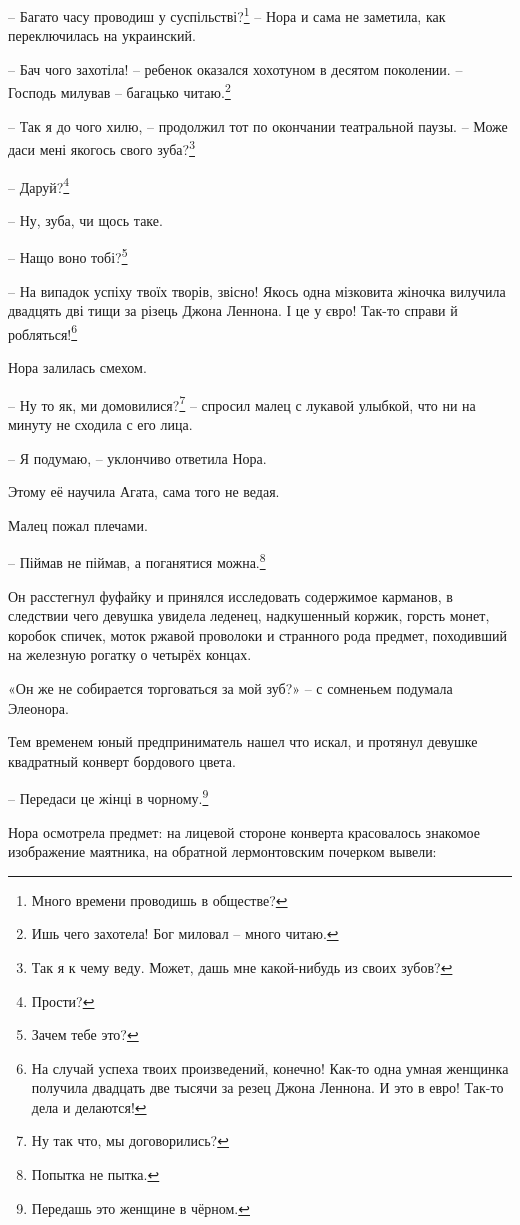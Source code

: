 \documentclass[
  a5paperpaper,
  DIV=11,
  numbers=noendperiod]{scrreprt}
\begin{document}
-- Багато часу проводиш у суспільстві?\footnote{Много времени проводишь
  в обществе?} -- Нора и сама не заметила, как переключилась на
украинский.

-- Бач чого захотіла! -- ребенок оказался хохотуном в десятом поколении.
-- Господь милував -- багацько читаю.\footnote{Ишь чего захотела! Бог
  миловал -- много читаю.}

-- Так я до чого хилю, -- продолжил тот по окончании театральной паузы.
-- Може даси мені якогось свого зуба?\footnote{Так я к чему веду. Может,
  дашь мне какой-нибудь из своих зубов?}

-- Даруй?\footnote{Прости?}

-- Ну, зуба, чи щось таке.

-- Нащо воно тобі?\footnote{Зачем тебе это?}

-- На випадок успіху твоїх творів, звісно! Якось одна мізковита жіночка
вилучила двадцять дві тищи за різець Джона Леннона. І це у євро! Так-то
справи й робляться!\footnote{На случай успеха твоих произведений,
  конечно! Как-то одна умная женщинка получила двадцать две тысячи за
  резец Джона Леннона. И это в евро! Так-то дела и делаются!}

Нора залилась смехом.

-- Ну то як, ми домовилися?\footnote{Ну так что, мы договорились?} --
спросил малец с лукавой улыбкой, что ни на минуту не сходила с его лица.

-- Я подумаю, -- уклончиво ответила Нора.

Этому её научила Агата, сама того не ведая.

Малец пожал плечами.

-- Піймав не піймав, а поганятися можна.\footnote{Попытка не пытка.}

Он расстегнул фуфайку и принялся исследовать содержимое карманов, в
следствии чего девушка увидела леденец, надкушенный коржик, горсть
монет, коробок спичек, моток ржавой проволоки и странного рода предмет,
походивший на железную рогатку о четырёх концах.

«Он же не собирается торговаться за мой зуб?» -- с сомненьем подумала
Элеонора.

Тем временем юный предприниматель нашел что искал, и протянул девушке
квадратный конверт бордового цвета.

-- Передаси це жінці в чорному.\footnote{Передашь это женщине в чёрном.}

Нора осмотрела предмет: на лицевой стороне конверта красовалось знакомое
изображение маятника, на обратной лермонтовским почерком вывели:
\end{document}
